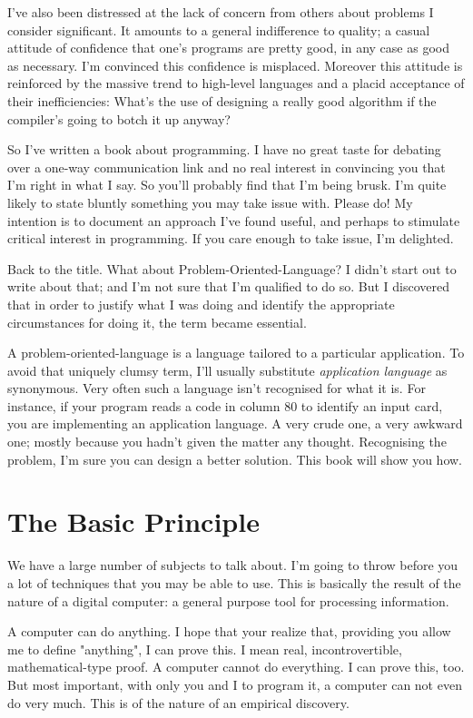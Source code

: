 \documentclass[b5paper, oneside]{book}
\begin{document}
I've also been distressed at the lack of concern from others about problems I consider significant. It amounts to a general indifference to quality; a casual attitude of confidence that one's programs are pretty good, in any case as good as necessary. I'm convinced this confidence is misplaced. Moreover this attitude is reinforced by the massive trend to high-level languages and a placid acceptance of their inefficiencies: What's the use of designing a really good algorithm if the compiler's going to botch it up anyway?

So I've written a book about programming. I have no great taste for debating over a one-way communication link and no real interest in convincing you that I'm right in what I say. So you'll probably find that I'm being brusk. I'm quite likely to state bluntly something you may take issue with. Please do! My intention is to document an approach I've found useful, and perhaps to stimulate critical interest in programming. If you care enough to take issue, I'm delighted.

Back to the title. What about Problem-Oriented-Language? I didn't start out to write about that; and I'm not sure that I'm qualified to do so. But I discovered that in order to justify what I was doing and identify the appropriate circumstances for doing it, the term became essential.

A problem-oriented-language is a language tailored to a particular application. To avoid that uniquely clumsy term, I'll usually substitute {\em application language} as synonymous. Very often such a language isn't recognised for what it is. For instance, if your program reads a code in column 80 to identify an input card, you are implementing an application language. A very crude one, a very awkward one; mostly because you hadn't given the matter any thought. Recognising the problem, I'm sure you can design a better solution. This book will show you how.

\section{The Basic Principle}
We have a large number of subjects to talk about. I'm going to throw before you a lot of techniques that you may be able to use. This is basically the result of the nature of a digital computer: a general purpose tool for processing information.

A computer can do anything. I hope that your realize that, providing you allow me to define "anything", I can prove this. I mean real, incontrovertible, mathematical-type proof. A computer cannot do everything. I can prove this, too. But most important, with only you and I to program it, a computer can not even do very much. This is of the nature of an empirical discovery.
\end{document}
